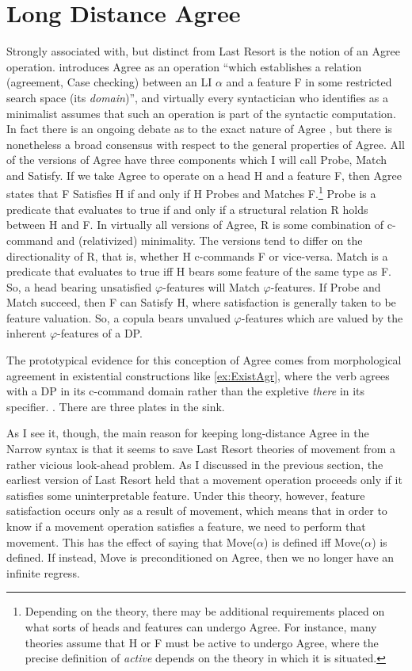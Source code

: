 \documentclass[MilwayThesis]{subfiles}
\begin{document}
\section{Long Distance Agree}
Strongly associated with, but distinct from Last Resort is the notion of an Agree operation.
\textcite[101]{chomsky2000minimalist} introduces Agree as an operation ``which establishes a relation (agreement, Case checking) between an LI $\alpha$ and a feature F in some restricted search space (its \textit{domain})'', and virtually every syntactician who identifies as a minimalist assumes that such an operation is part of the syntactic computation.
In fact there is an ongoing debate as to the exact nature of Agree \parencite{zeijlstra2012there,preminger2013thats,bjorkman2014upward}, but there is nonetheless a broad consensus with respect to the general properties of Agree.
All of the versions of Agree have three components which I will call Probe, Match and Satisfy.
If we take Agree to operate on a head H and a feature F, then Agree states that F Satisfies H if and only if H Probes and Matches F.\footnote{
	Depending on the theory, there may be additional requirements placed on what sorts of heads and features can undergo Agree.
	For instance, many theories assume that H or F must be active to undergo Agree, where the precise definition of \textit{active} depends on the theory in which it is situated.  
}
Probe is a predicate that evaluates to true if and only if a structural relation R holds between H and F.
In virtually all versions of Agree, R is some combination of c-command and (relativized) minimality.
The versions tend to differ on the directionality of R, that is, whether H c-commands F or vice-versa.
Match is a predicate that evaluates to true iff H bears some feature of the same type as F.
So, a head bearing unsatisfied $\varphi$-features will Match $\varphi$-features.
If Probe and Match succeed, then F can Satisfy H, where satisfaction is generally taken to be feature valuation.
So, a copula bears unvalued $\varphi$-features which are valued by the inherent $\varphi$-features of a DP.

The prototypical evidence for this conception of Agree comes from morphological agreement in existential constructions like \cref{ex:ExistAgr}, where the verb agrees with a DP in its c-command domain rather than the expletive \textit{there} in its specifier.
\ex.\label{ex:ExistAgr} There are three plates in the sink.

As I see it, though, the main reason for keeping long-distance Agree in the Narrow syntax is that it seems to save Last Resort theories of movement from a rather vicious look-ahead problem.
As I discussed in the previous section, the earliest version of Last Resort held that a movement operation proceeds only if it satisfies some uninterpretable feature.
Under this theory, however, feature satisfaction occurs only as a result of movement, which means that in order to know if a movement operation satisfies a feature, we need to perform that movement.
This has the effect of saying that Move($\alpha$) is defined iff Move($\alpha$) is defined.
If instead, Move is preconditioned on Agree, then we no longer have an infinite regress.
\end{document}
